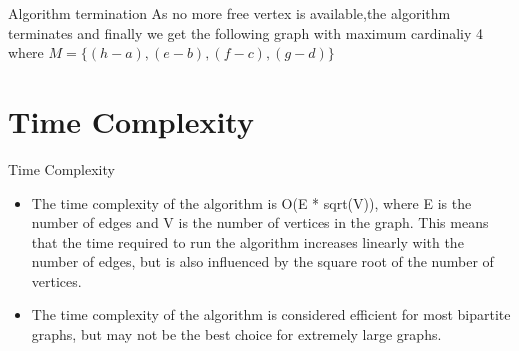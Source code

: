 \documentclass{beamer}
\begin{document}
\begin{frame}{Algorithm termination}
As no more free vertex is available,the algorithm terminates and finally we get the following graph with maximum cardinaliy 4 where
    $M=\{(h-a),(e-b),(f-c),(g-d)\}$\\
        \vspace{.8cm}
\hspace{2.7cm}
\end{frame}

\section{Time Complexity}
\begin{frame}{Time Complexity}
    \begin{itemize}
        \item<1-> The time complexity of the algorithm is O(E * sqrt(V)), where E is the number of edges and V is the number of vertices in the graph. This means that the time required to run the algorithm increases linearly with the number of edges, but is also influenced by the square root of the number of vertices.
        \item<2->The time complexity of the algorithm is considered efficient for most bipartite graphs, but may not be the best choice for extremely large graphs.

    \end{itemize}
\end{frame}
\end{document}

